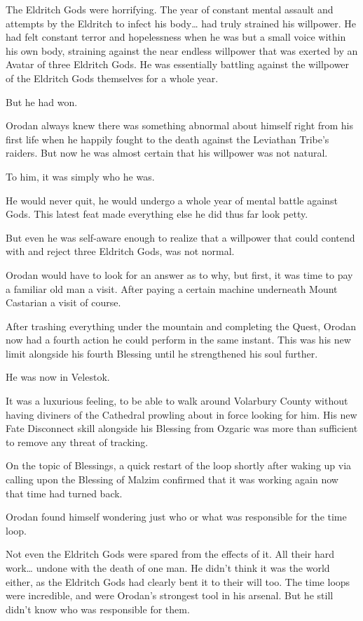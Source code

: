 \documentclass[a4paper,10pt]{book}
\begin{document}
The Eldritch Gods were horrifying. The year of constant mental assault and attempts by the Eldritch to infect his body… had truly strained his willpower. He had felt constant terror and hopelessness when he was but a small voice within his own body, straining against the near endless willpower that was exerted by an Avatar of three Eldritch Gods. He was essentially battling against the willpower of the Eldritch Gods themselves for a whole year.\par
But he had won.\par
Orodan always knew there was something abnormal about himself right from his first life when he happily fought to the death against the Leviathan Tribe’s raiders. But now he was almost certain that his willpower was not natural.\par
To him, it was simply who he was.\par
He would never quit, he would undergo a whole year of mental battle against Gods. This latest feat made everything else he did thus far look petty.\par
But even he was self-aware enough to realize that a willpower that could contend with and reject three Eldritch Gods, was not normal.\par
Orodan would have to look for an answer as to why, but first, it was time to pay a familiar old man a visit. After paying a certain machine underneath Mount Castarian a visit of course.\par
\par
After trashing everything under the mountain and completing the Quest, Orodan now had a fourth action he could perform in the same instant. This was his new limit alongside his fourth Blessing until he strengthened his soul further.\par
He was now in Velestok.\par
It was a luxurious feeling, to be able to walk around Volarbury County without having diviners of the Cathedral prowling about in force looking for him. His new Fate Disconnect skill alongside his Blessing from Ozgaric was more than sufficient to remove any threat of tracking.\par
On the topic of Blessings, a quick restart of the loop shortly after waking up via calling upon the Blessing of Malzim confirmed that it was working again now that time had turned back.\par
Orodan found himself wondering just who or what was responsible for the time loop.\par
Not even the Eldritch Gods were spared from the effects of it. All their hard work… undone with the death of one man. He didn’t think it was the world either, as the Eldritch Gods had clearly bent it to their will too. The time loops were incredible, and were Orodan’s strongest tool in his arsenal. But he still didn't know who was responsible for them.\par
\end{document}
